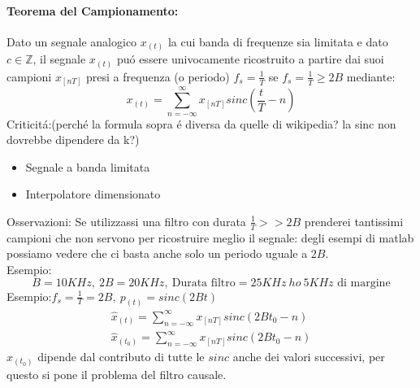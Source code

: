         \paragraph{Teorema del Campionamento:} Dato un segnale analogico $x_{(t)}$ la cui banda di frequenze sia limitata e dato $c\in \mathbb{Z}$,
        il segnale $x_{(t)}$ puó essere univocamente ricostruito a partire dai suoi campioni $x_{[nT]}$ presi a frequenza (o periodo) $f_s = \frac{1}{T}$ se 
        $f_s = \frac{1}{T} \geq 2B$ mediante:
        \[
            x_{(t)} = \sum_{n=-\infty}^{\infty} x_{[nT]}sinc\left(\frac{t}{T}-n\right) 
        \]
        Criticitá:(perché la formula sopra é diversa da quelle di wikipedia? la sinc non dovrebbe dipendere da k?)
        \begin{itemize}
            \item {Segnale a banda limitata}
            \item {Interpolatore dimensionato}
        \end{itemize}
        Osservazioni: Se utilizzassi una filtro con durata $\frac{1}{T}>>2B$ prenderei tantissimi campioni che
        non servono per ricostruire meglio il segnale: degli esempi di matlab possiamo vedere che ci basta anche solo un periodo uguale a $2B$.\\
        Esempio:
        \[
            B = 10KHz,\ 2B = 20KHz,\ \text{Durata filtro} = 25KHz\ ho\ 5KHz\text{ di margine}
        \]
        Esempio:$f_s = \frac{1}{T} = 2B,\ p_{(t)}=sinc(2Bt)$
        \begin{gather}
                \hat{x}_{(t)} = \sum_{n=-\infty}^{\infty} x_{[nT]}sinc\left(2Bt_0 -n\right) \nonumber \\
                \hat{x}_{(t_0)} = \sum_{n=-\infty}^{\infty} x_{[nT]}sinc\left(2Bt_0 -n\right) \nonumber
        \end{gather}
        $\hat{x}_{(t_0)}$ dipende dal contributo di tutte le $sinc$ anche dei valori successivi, per questo si pone il problema del filtro causale. 
